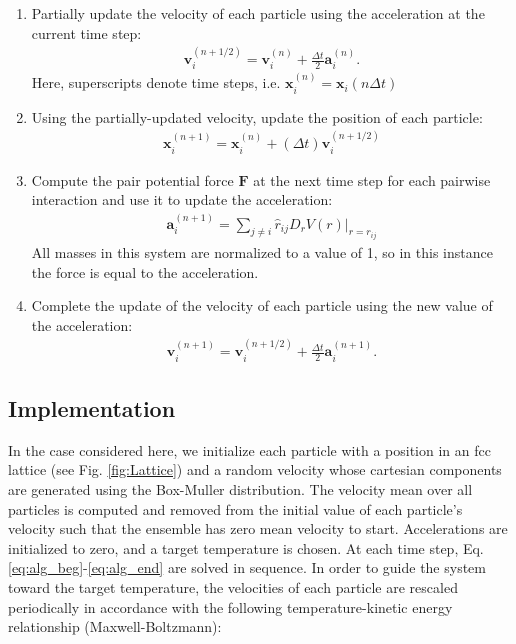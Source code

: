 \documentclass[10pt,a4paper]{article}
\begin{document}
\begin{enumerate}
 \item Partially update the velocity of each particle using the acceleration at the current time step:\\
  \begin{align}
   \mathbf{v}_i^{(n+1/2)} = \mathbf{v}_i^{(n)} + \frac{\Delta t}{2} \mathbf{a}_i^{(n)}. \label{eq:alg_beg}
  \end{align}
  Here, superscripts denote time steps, i.e. $\mathbf{x}_i^{(n)}=\mathbf{x}_i(n\Delta t)$
  \item Using the partially-updated velocity, update the position of each particle:\\
  \begin{align}
   \mathbf{x}_i^{(n+1)} = \mathbf{x}_i^{(n)} + (\Delta t) \mathbf{v}_i^{(n+1/2)}
  \end{align}
  \item Compute the pair potential force $\mathbf{F}$ at the next time step for each pairwise interaction and use it to update the acceleration:\\
  \begin{align}
   \mathbf{a}_i^{(n+1)} = \sum_{j \neq i} \hat{r}_{ij} D_r V(r)|_{r=r_{ij}}
  \end{align}
  All masses in this system are normalized to a value of 1, so in this instance the force is equal to the acceleration.
  \item Complete the update of the velocity of each particle using the new value of the acceleration:
  \begin{align}
   \mathbf{v}_i^{(n+1)} = \mathbf{v}_i^{(n+1/2)} + \frac{\Delta t}{2} \mathbf{a}_i^{(n+1)}.\label{eq:alg_end}
  \end{align}
\end{enumerate}

\subsection{Implementation}
In the case considered here, we initialize each particle with a position in an fcc lattice (see Fig. \ref{fig:Lattice}) and a random velocity whose cartesian components are generated using the Box-Muller distribution. The velocity mean over all particles is computed and removed from the initial value of each particle's velocity such that the ensemble has zero mean velocity to start. Accelerations are initialized to zero, and a target temperature is chosen. At each time step, Eq. \ref{eq:alg_beg}-\ref{eq:alg_end} are solved in sequence. In order to guide the system toward the target temperature, the velocities of each particle are rescaled periodically in accordance with the following temperature-kinetic energy relationship (Maxwell-Boltzmann):
\end{document}

